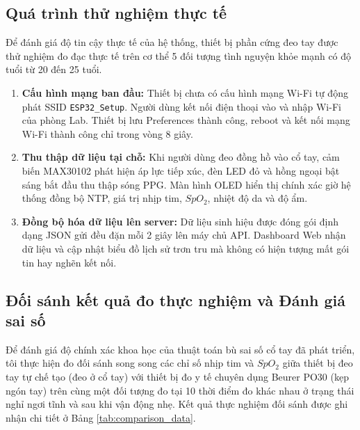\subsection{Quá trình thử nghiệm thực tế}
Để đánh giá độ tin cậy thực tế của hệ thống, thiết bị phần cứng đeo tay được thử nghiệm đo đạc thực tế trên cơ thể 5 đối tượng tình nguyện khỏe mạnh có độ tuổi từ 20 đến 25 tuổi.
\begin{enumerate}
    \item \textbf{Cấu hình mạng ban đầu:} Thiết bị chưa có cấu hình mạng Wi-Fi tự động phát SSID \texttt{ESP32\_Setup}. Người dùng kết nối điện thoại vào và nhập Wi-Fi của phòng Lab. Thiết bị lưu Preferences thành công, reboot và kết nối mạng Wi-Fi thành công chỉ trong vòng 8 giây.
    \item \textbf{Thu thập dữ liệu tại chỗ:} Khi người dùng đeo đồng hồ vào cổ tay, cảm biến MAX30102 phát hiện áp lực tiếp xúc, đèn LED đỏ và hồng ngoại bật sáng bắt đầu thu thập sóng PPG. Màn hình OLED hiển thị chính xác giờ hệ thống đồng bộ NTP, giá trị nhịp tim, $SpO_2$, nhiệt độ da và độ ẩm.
    \item \textbf{Đồng bộ hóa dữ liệu lên server:} Dữ liệu sinh hiệu được đóng gói định dạng JSON gửi đều đặn mỗi 2 giây lên máy chủ API. Dashboard Web nhận dữ liệu và cập nhật biểu đồ lịch sử trơn tru mà không có hiện tượng mất gói tin hay nghẽn kết nối.
\end{enumerate}

\subsection{Đối sánh kết quả đo thực nghiệm và Đánh giá sai số}
Để đánh giá độ chính xác khoa học của thuật toán bù sai số cổ tay đã phát triển, tôi thực hiện đo đối sánh song song các chỉ số nhịp tim và $SpO_2$ giữa thiết bị đeo tay tự chế tạo (đeo ở cổ tay) với thiết bị đo y tế chuyên dụng Beurer PO30 (kẹp ngón tay) trên cùng một đối tượng đo tại 10 thời điểm đo khác nhau ở trạng thái nghỉ ngơi tĩnh và sau khi vận động nhẹ. Kết quả thực nghiệm đối sánh được ghi nhận chi tiết ở Bảng \ref{tab:comparison_data}.

